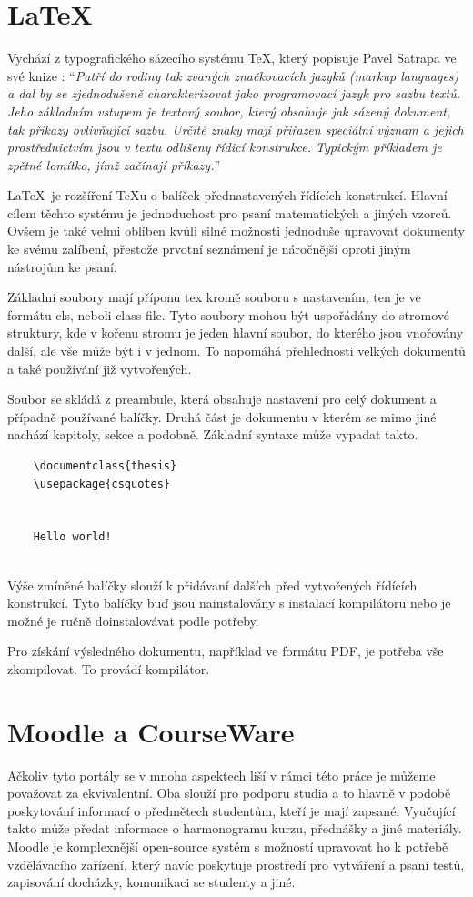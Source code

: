  \section{LaTeX} 
	Vychází z typografického sázecího systému \TeX, který popisuje Pavel Satrapa ve své knize \cite{latex}: \enquote{\textit{Patří do rodiny tak zvaných značkovacích jazyků (markup languages) a dal by se zjednodušeně charakterizovat jako programovací jazyk pro sazbu textů. Jeho základním vstupem je textový soubor, který obsahuje jak sázený dokument, tak příkazy ovlivňující sazbu. Určité znaky mají přiřazen speciální význam a jejich prostřednictvím jsou v textu odlišeny řídicí konstrukce. Typickým příkladem je zpětné lomítko, jímž začínají příkazy.}}
	
	\LaTeX\ je rozšíření \TeX u o balíček přednastavených řídících konstrukcí. Hlavní cílem těchto systému je jednoduchost pro psaní matematických a jiných vzorců. Ovšem je také velmi oblíben kvůli silné možnosti jednoduše upravovat dokumenty ke svému zalíbení, přestože prvotní seznámení je náročnější oproti jiným nástrojům ke psaní.
	
	Základní soubory mají příponu tex kromě souboru s nastavením, ten je ve formátu cls, neboli class file. Tyto soubory mohou být uspořádány do stromové struktury, kde v kořenu stromu je jeden hlavní soubor, do kterého jsou vnořovány další, ale vše může být i v jednom. To napomáhá přehlednosti velkých dokumentů a také používání již vytvořených. 
	
	Soubor se skládá z preambule, která obsahuje nastavení pro celý dokument a případně používané balíčky. Druhá část je dokumentu v kterém se mimo jiné nachází kapitoly, sekce a podobně. Základní syntaxe může vypadat takto.
	\begin{verbatim}
	\documentclass{thesis}
	\usepackage{csquotes}
	
	
	Hello world!
	
	\end{verbatim}
	
	Výše zmíněné balíčky slouží k přidávaní dalších před vytvořených řídících konstrukcí. Tyto balíčky buď jsou nainstalovány s instalací kompilátoru nebo je možné je ručně doinstalovávat podle potřeby. 
	
	Pro získání výsledného dokumentu, například ve formátu PDF, je potřeba vše zkompilovat. To provádí kompilátor.  

\section{Moodle a CourseWare}
	Ačkoliv tyto portály se v mnoha aspektech liší v rámci této práce je můžeme považovat za ekvivalentní. Oba slouží pro podporu studia a to hlavně v podobě poskytování informací o předmětech studentům, kteří je mají zapsané. Vyučující takto může předat informace o harmonogramu kurzu, přednášky a jiné materiály. Moodle je komplexnější open-source systém s možností upravovat ho k potřebě vzdělávacího zařízení, který navíc poskytuje prostředí pro vytváření a psaní testů, zapisování docházky, komunikaci se studenty a jiné.

